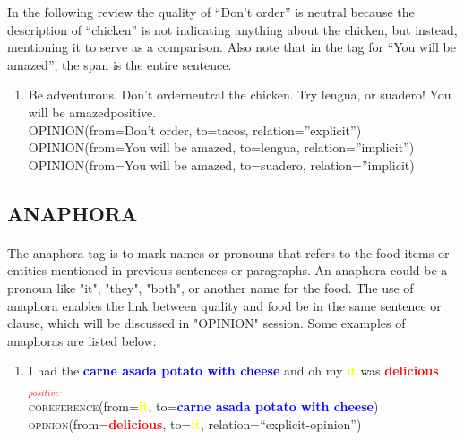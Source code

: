 \documentclass{article}
\begin{document}
In the following review the quality of “Don’t order” is neutral because the description of “chicken” is not indicating anything about the chicken, but instead, mentioning it to serve as a comparison. Also note that in the tag for “You will be amazed”, the span is the entire sentence. 

\begin{enumerate}[resume]
\item Be adventurous. Don't orderneutral the chicken. Try lengua, or suadero! You will be amazedpositive.\\
	OPINION(from=Don’t order, to=tacos, relation=”explicit”)\\
	OPINION(from=You will be amazed, to=lengua, relation=”implicit”)\\
	OPINION(from=You will be amazed, to=suadero, relation=”implicit)
\end{enumerate}


\subsection{ANAPHORA}
\paragraph{}
The anaphora tag is to mark names or pronouns that refers to the food items or entities mentioned in previous sentences or paragraphs. An anaphora could be a pronoun like "it", "they", "both", or another name for the food. The use of anaphora enables the link between quality and food be in the same sentence or clause, which will be discussed in "OPINION" session. Some examples of anaphoras are listed below:

\begin{enumerate}[resume]
	\item I had the \textbf{\textcolor{blue}{carne asada potato with cheese}} and oh my \textbf{\textcolor{yellow}{it}} was \textbf{\textcolor{red}{delicious$_{positive}$}}.\\
	\textsc{coreference}(from=\textbf{\textcolor{yellow}{it}}, to=\textbf{\textcolor{blue}{carne asada potato with cheese}})\\
		\textsc{opinion}(from=\textbf{\textcolor{red}{delicious}}, to=\textbf{\textcolor{yellow}{it}}, relation=``explicit-opinion'')\\
\end{enumerate}
\end{document}
